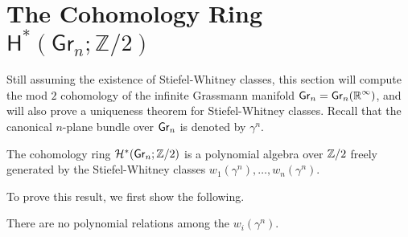 \chapter{The Cohomology Ring $\mathsf{H}^{*}(\mathsf{Gr}_{n}; \mathbb{Z} / 2)$}
Still assuming the existence of Stiefel-Whitney classes, this section will compute the mod $2$ cohomology of the infinite Grassmann manifold $\grass{n}{}=\grass{n}{\infty}$, and will also prove a uniqueness theorem for Stiefel-Whitney classes. Recall that the canonical $n$-plane bundle over $\grass{n}{}$ is denoted by $\gamma^{n}$.\linebreak
\begin{theorem}\label{thm-7-1}
	 The cohomology ring $\homology^{*}(\grass{n}{} ; \Z / 2)$ is a polynomial algebra over $\mathbb{Z} / 2$ freely generated by the Stiefel-Whitney classes $w_{1}(\gamma^{n}), \dots, w_{n}(\gamma^{n})$.
\end{theorem}
\vspace{.3cm}
To prove this result, we first show the following.
\vspace{.3cm}
\begin{lemma}\label{lem-7-2}
	There are no polynomial relations among the $w_{i}(\gamma^{n})$.
\end{lemma}

